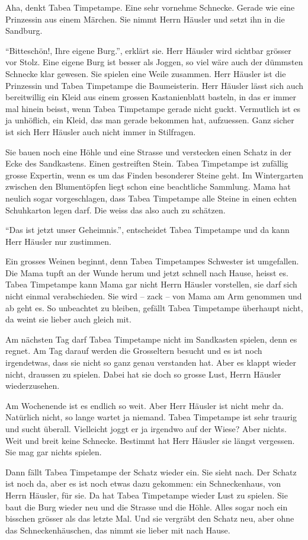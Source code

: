 Aha, denkt Tabea Timpetampe. Eine sehr vornehme Schnecke. Gerade wie eine Prinzessin aus einem Märchen. Sie nimmt Herrn Häusler und setzt ihn in die Sandburg.

\enquote{Bitteschön!, Ihre eigene Burg.}, erklärt sie. Herr Häusler wird sichtbar grösser vor Stolz. Eine eigene Burg ist besser als Joggen, so viel wäre auch der dümmsten Schnecke klar gewesen. Sie spielen eine Weile zusammen. Herr Häusler ist die Prinzessin und Tabea Timpetampe die Baumeisterin. Herr Häusler lässt sich auch bereitwillig ein Kleid aus einem grossen Kastanienblatt basteln, in das er immer mal hinein beisst, wenn Tabea Timpetampe gerade nicht guckt. Vermutlich ist es ja unhöflich, ein Kleid, das man gerade bekommen hat, aufzuessen. Ganz sicher ist sich Herr Häusler auch nicht immer in Stilfragen.

Sie bauen noch eine Höhle und eine Strasse und verstecken einen Schatz in der Ecke des Sandkastens. Einen gestreiften Stein. Tabea Timpetampe ist zufällig grosse Expertin, wenn es um das Finden besonderer Steine geht. Im Wintergarten zwischen den Blumentöpfen liegt schon eine beachtliche Sammlung. Mama hat neulich sogar vorgeschlagen, dass Tabea Timpetampe alle Steine in einen echten Schuhkarton legen darf. Die weiss das also auch zu schätzen.

\enquote{Das ist jetzt unser Geheimnis.}, entscheidet Tabea Timpetampe und da kann Herr Häusler nur zustimmen. 

Ein grosses Weinen beginnt, denn Tabea Timpetampes Schwester ist umgefallen. Die Mama tupft an der Wunde herum und jetzt schnell nach Hause, heisst es. Tabea Timpetampe kann Mama gar nicht Herrn Häusler vorstellen, sie darf sich nicht einmal verabschieden. Sie wird -- zack -- von Mama am Arm genommen und ab geht es. So unbeachtet zu bleiben, gefällt Tabea Timpetampe überhaupt nicht, da weint sie lieber auch gleich mit.

Am nächsten Tag darf Tabea Timpetampe nicht im Sandkasten spielen, denn es regnet. Am Tag darauf werden die Grosseltern besucht und es ist noch irgendetwas, dass sie nicht so ganz genau verstanden hat. Aber es klappt wieder nicht, draussen zu spielen. Dabei hat sie doch so grosse Lust, Herrn Häusler wiederzusehen. 

Am Wochenende ist es endlich so weit. Aber Herr Häusler ist nicht mehr da. Natürlich nicht, so lange wartet ja niemand. Tabea Timpetampe ist sehr traurig und sucht überall. Vielleicht joggt er ja irgendwo auf der Wiese? Aber nichts. Weit und breit keine Schnecke. Bestimmt hat Herr Häusler sie längst vergessen. Sie mag gar nichts spielen.

Dann fällt Tabea Timpetampe der Schatz wieder ein. Sie sieht nach. Der Schatz ist noch da, aber es ist noch etwas dazu gekommen: ein Schneckenhaus, von Herrn Häusler, für sie. Da hat Tabea Timpetampe wieder Lust zu spielen. Sie baut die Burg wieder neu und die Strasse und die Höhle. Alles sogar noch ein bisschen grösser als das letzte Mal. Und sie vergräbt den Schatz neu, aber ohne das Schneckenhäuschen, das nimmt sie lieber mit nach Hause. \hfill {\color{red}\decofourleft}
